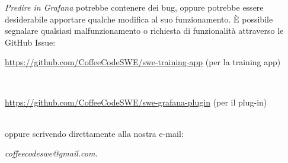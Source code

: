 \documentclass[../manuale-utente.tex]{subfiles}
\begin{document}
\textit{Predire in Grafana} potrebbe contenere dei bug, oppure potrebbe essere desiderabile apportare qualche modifica al suo funzionamento. È possibile segnalare qualsiasi malfunzionamento o richiesta di funzionalità attraverso le GitHub Issue: \\
\newline
\centerline{\url{https://github.com/CoffeeCodeSWE/swe-training-app} (per la training app)} \\
\centerline{\url{https://github.com/CoffeeCodeSWE/swe-grafana-plugin} (per il plug-in)} \\
\newline
oppure scrivendo direttamente alla nostra e-mail: \\
\newline
\centerline{\textit{coffeecodeswe@gmail.com}.} \\
\end{document}
